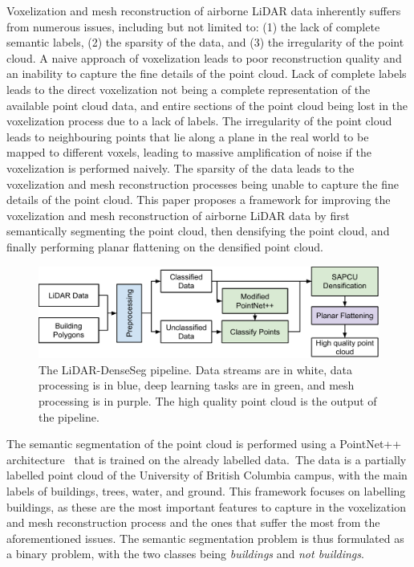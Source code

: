 \documentclass[10pt,twocolumn,letterpaper]{article}
\begin{document}
    Voxelization and mesh reconstruction of airborne LiDAR data inherently suffers from numerous issues, including but not limited to: (1) the lack of complete semantic labels, (2) the sparsity of the data, and (3) the irregularity of the point cloud.
    A naive approach of voxelization leads to poor reconstruction quality and an inability to capture the fine details of the point cloud\cite{MinecraftUBC}.
    Lack of complete labels leads to the direct voxelization not being a complete representation of the available point cloud data, and entire sections of the point cloud being lost in the voxelization process due to a lack of labels.
    The irregularity of the point cloud leads to neighbouring points that lie along a plane in the real world to be mapped to different voxels, leading to massive amplification of noise if the voxelization is performed naively.
    The sparsity of the data leads to the voxelization and mesh reconstruction processes being unable to capture the fine details of the point cloud.
    This paper proposes a framework for improving the voxelization and mesh reconstruction of airborne LiDAR data by first semantically segmenting the point cloud, then densifying the point cloud, and finally performing planar flattening on the densified point cloud.

    \begin{figure}
        \centering
        \includegraphics[width=\linewidth]{533Y Model Pipeline.pdf}
        \caption{The LiDAR-DenseSeg pipeline. Data streams are in white, data processing is in blue, deep learning tasks are in green, and mesh processing is in purple. The high quality point cloud is the output of the pipeline.}
        \label{fig:pipeline}
    \end{figure}

    The semantic segmentation of the point cloud is performed using a PointNet++ architecture~\cite{qi2017pointnet} that is trained on the already labelled data.\
    The data is a partially labelled point cloud of the University of British Columbia campus, with the main labels of buildings, trees, water, and ground.
    This framework focuses on labelling buildings, as these are the most important features to capture in the voxelization and mesh reconstruction process and the ones that suffer the most from the aforementioned issues.
    The semantic segmentation problem is thus formulated as a binary problem, with the two classes being \textit{buildings} and \textit{not buildings}.
\end{document}
